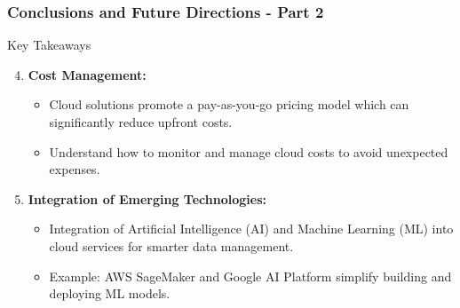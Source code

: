 \documentclass[aspectratio=169]{beamer}
\begin{document}
\begin{frame}[fragile]
    \frametitle{Conclusions and Future Directions - Part 2}
    \begin{block}{Key Takeaways}
        \begin{enumerate}
            \setcounter{enumi}{3}
            \item \textbf{Cost Management:}
            \begin{itemize}
                \item Cloud solutions promote a pay-as-you-go pricing model which can significantly reduce upfront costs.
                \item Understand how to monitor and manage cloud costs to avoid unexpected expenses.
            \end{itemize}
            
            \item \textbf{Integration of Emerging Technologies:}
            \begin{itemize}
                \item Integration of Artificial Intelligence (AI) and Machine Learning (ML) into cloud services for smarter data management.
                \item Example: AWS SageMaker and Google AI Platform simplify building and deploying ML models.
            \end{itemize}
        \end{enumerate}
    \end{block}
\end{frame}
\end{document}
